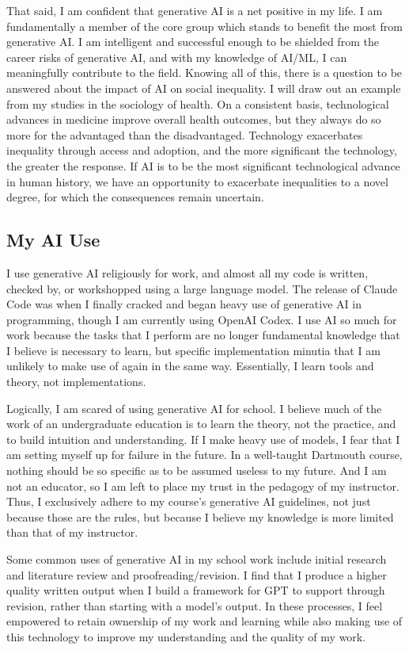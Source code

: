 \documentclass[12pt]{article}
\begin{document}
That said, I am confident that generative AI is a net positive in my life.
I am fundamentally a member of the core group which stands to benefit the most from generative AI.
I am intelligent and successful enough to be shielded from the career risks of generative AI, and with my knowledge of AI/ML, I can meaningfully contribute to the field.
Knowing all of this, there is a question to be answered about the impact of AI on social inequality.
I will draw out an example from my studies in the sociology of health.
On a consistent basis, technological advances in medicine improve overall health outcomes, but they always do so more for the advantaged than the disadvantaged.
Technology exacerbates inequality through access and adoption, and the more significant the technology, the greater the response.
If AI is to be the most significant technological advance in human history, we have an opportunity to exacerbate inequalities to a novel degree, for which the consequences remain uncertain.
\subsection{My AI Use}
I use generative AI religiously for work, and almost all my code is written, checked by, or workshopped using a large language model.
The release of Claude Code was when I finally cracked and began heavy use of generative AI in programming, though I am currently using OpenAI Codex.
I use AI so much for work because the tasks that I perform are no longer fundamental knowledge that I believe is necessary to learn, but specific implementation minutia that I am unlikely to make use of again in the same way.
Essentially, I learn tools and theory, not implementations.

Logically, I am scared of using generative AI for school. 
I believe much of the work of an undergraduate education is to learn the theory, not the practice, and to build intuition and understanding.
If I make heavy use of models, I fear that I am setting myself up for failure in the future.
In a well-taught Dartmouth course, nothing should be so specific as to be assumed useless to my future.
And I am not an educator, so I am left to place my trust in the pedagogy of my instructor.
Thus, I exclusively adhere to my course's generative AI guidelines, not just because those are the rules, but because I believe my knowledge is more limited than that of my instructor.

Some common uses of generative AI in my school work include initial research and literature review and proofreading/revision.
I find that I produce a higher quality written output when I build a framework for GPT to support through revision, rather than starting with a model's output.
In these processes, I feel empowered to retain ownership of my work and learning while also making use of this technology to improve my understanding and the quality of my work.
\end{document}
